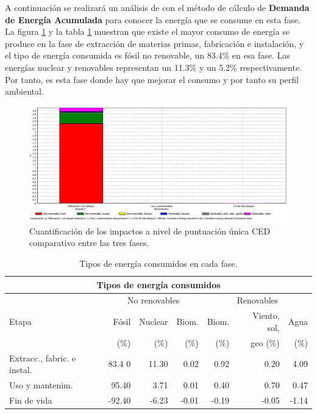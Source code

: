 A continuación se realizará un análisis de con el método de cálculo de \textbf{Demanda de Energía Acumulada} para conocer la energía que se consume en esta fase. La figura \ref{fig:ced_puntuacionunica} y la tabla \ref{tiposenergiaced} muestran que existe el mayor consumo de energía se produce en la fase de extracción de materias primas, fabricación e instalación, y el tipo de energía consumida es fósil no renovable, un 83.4\% en esa fase. Las energías nuclear y renovables representan un 11.3\% y un 5.2\% respectivamente. Por tanto, es esta fase donde hay que mejorar el consumo y por tanto su perfil ambiental.


\begin{figure}[!htb]
\centering
\includegraphics[width=15cm]{img/ced_puntuacionunica.png}
\caption{Cuantificación de los impactos a nivel de puntuación única CED comparativo entre las tres fases.}
\label{fig:ced_puntuacionunica}
\end{figure}

\begin{table}[!htb]
\centering
\begin{tabular}{p{2cm}rrrrrr}
\toprule
\multicolumn{7}{c}{Tipos de energía consumidos}\\
\midrule
 & \multicolumn{3}{c}{No renovables} & \multicolumn{3}{c}{Renovables}\\
\midrule
Etapa & Fósil & Nuclear & Biom. & Biom. & Viento, sol,& Agua\\
& (\%) & (\%) & (\%) & (\%) & geo (\%) & (\%)\\
\midrule
Extracc., fabric. e instal. & 83.4 0& 11.30 & 0.02 & 0.92 & 0.20 & 4.09\\
Uso y mantenim. & 95.40 & 3.71 & 0.01 & 0.40 & 0.70 & 0.47 \\
Fin de vida & -92.40 & -6.23 & -0.01 & -0.19 & -0.05 & -1.14 \\
\bottomrule
\end{tabular}
\caption{Tipos de energía consumidos en cada fase.}
\label{tiposenergiaced}
\end{table}

